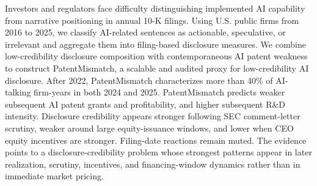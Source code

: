 Investors and regulators face difficulty distinguishing implemented AI capability from narrative positioning in annual 10-K filings. Using U.S. public firms from 2016 to 2025, we classify AI-related sentences as actionable, speculative, or irrelevant and aggregate them into filing-based disclosure measures. We combine low-credibility disclosure composition with contemporaneous AI patent weakness to construct PatentMismatch, a scalable and audited proxy for low-credibility AI disclosure. After 2022, PatentMismatch characterizes more than 40\% of AI-talking firm-years in both 2024 and 2025. PatentMismatch predicts weaker subsequent AI patent grants and profitability, and higher subsequent R\&D intensity. Disclosure credibility appears stronger following SEC comment-letter scrutiny, weaker around large equity-issuance windows, and lower when CEO equity incentives are stronger. Filing-date reactions remain muted. The evidence points to a disclosure-credibility problem whose strongest patterns appear in later realization, scrutiny, incentives, and financing-window dynamics rather than in immediate market pricing.